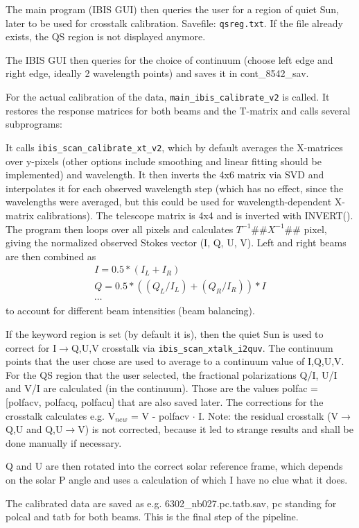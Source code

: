 \documentclass[a4paper,11pt]{article}
\begin{document}
The main program (IBIS GUI) then queries the user for a region of quiet Sun, later to be used for crosstalk calibration. Savefile: \texttt{qsreg.txt}. If the file already exists, the QS region is not displayed anymore.

The IBIS GUI then queries for the choice of continuum (choose left edge and right edge, ideally 2 wavelength points) and saves it in cont\_8542\_sav.

For the actual calibration of the data, \texttt{main\_ibis\_calibrate\_v2} is called. It restores the response matrices for both beams and the T-matrix and calls several subprograms: 


\begin{minipage}{0.05\textwidth}\hfill
\end{minipage}
\begin{minipage}{0.95\textwidth}
It calls \texttt{ibis\_scan\_calibrate\_xt\_v2}, which by default averages the X-matrices over y-pixels (other options include smoothing and linear fitting should be implemented) and wavelength. It then inverts the 4x6 matrix via SVD and interpolates it for each observed wavelength step (which has no effect, since the wavelengths were averaged, but this could be used for wavelength-dependent X-matrix calibrations). The telescope matrix is 4x4 and is inverted with INVERT().
The program then loops over all pixels and calculates $T^{-1} \#\# X^{-1} \#\#$ pixel, giving the normalized observed Stokes vector (I, Q, U, V). Left and right beams are then combined as
\begin{eqnarray*}
I = 0.5 * (I_L + I_R) \\
Q = 0.5 * ((Q_L / I_L) + (Q_R/I_R)) * I \\
\cdots
\end{eqnarray*}
to account for different beam intensities (beam balancing).

If the keyword region is set (by default it is), then the quiet Sun is used to correct for I$\rightarrow$Q,U,V crosstalk via \texttt{ibis\_scan\_xtalk\_i2quv}. The continuum points that the user chose are used to average to a continuum value of I,Q,U,V. For the QS region that the user selected, the fractional polarizations Q/I, U/I and V/I are calculated (in the continuum). Those are the values polfac = [polfacv, polfacq, polfacu] that are also saved later. The corrections for the crosstalk calculates e.g. V$_{new}$ = V - polfacv $\cdot$ I. Note: the residual crosstalk (V$\rightarrow$Q,U and Q,U$\rightarrow$V) is not corrected, because it led to strange results and shall be done manually if necessary.

Q and U are then rotated into the correct solar reference frame, which depends on the solar P angle and uses a calculation of which I have no clue what it does.

The calibrated data are saved as e.g. 6302\_nb027.pc.tatb.sav, pc standing for polcal and tatb for both beams. This is the final step of the pipeline.

\end{minipage}
\end{document}
